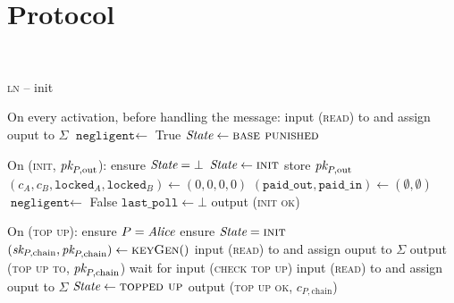 \section{Protocol} \ \\
\label{sec:protocol}

\begin{center}
  \begin{processbox}{\textsc{ln} -- init}
    \begin{algorithmic}[1]
      \State {}
      \State {}
      \State On every activation, before handling the message:
      \Indent
         
          \State input (\textsc{read}) to \ledger and assign ouput to $\Sigma$
           
            \State $\texttt{negligent} \gets$ True
            \label{code:ln:init:negligent}
          \EndIf
        \EndIf
         
          \State $\itistate \gets \textsc{base punished}$
        \EndIf
      \EndIndent
      \Statex

      \State On (\textsc{init}, $\textit{pk}_{P, \mathrm{out}}$):
      \Indent
        \State ensure $\itistate = \bot$
        \State $\itistate \gets \textsc{init}$
        \State store $\textit{pk}_{P, \mathrm{out}}$
        \State $(c_A, c_B, \texttt{locked}_A, \texttt{locked}_B) \gets (0, 0, 0,
        0)$
        \State $(\texttt{paid\_out}, \texttt{paid\_in}) \gets (\emptyset,
        \emptyset)$
        \State $\texttt{negligent} \gets$ False
        \State $\texttt{last\_poll} \gets \bot$
        \State output (\textsc{init ok})
      \EndIndent
      \Statex

      \State On (\textsc{top up}):
      \Indent
        \State ensure $P = \mathit{Alice}$ 
        \State ensure $\itistate = \textsc{init}$
        \label{code:ln:init:change-state}
        \State $(\textit{sk}_{P, \mathrm{chain}}, \textit{pk}_{P, \mathrm{chain}}) \gets
        \textsc{keyGen}()$
        \State input (\textsc{read}) to \ledger and assign ouput to $\Sigma$
        \State output (\textsc{top up to}, $\textit{pk}_{P, \mathrm{chain}}$)
          \State {}
          \State wait for input (\textsc{check top up})
          \State input (\textsc{read}) to \ledger and assign ouput to $\Sigma$
        \EndWhile
        \State $\itistate \gets \textsc{topped up}$
        \State output (\textsc{top up ok}, $c_{P, \mathrm{chain}}$)
      \EndIndent
      \Statex


\end{algorithmic}
\end{processbox}
\end{center}

